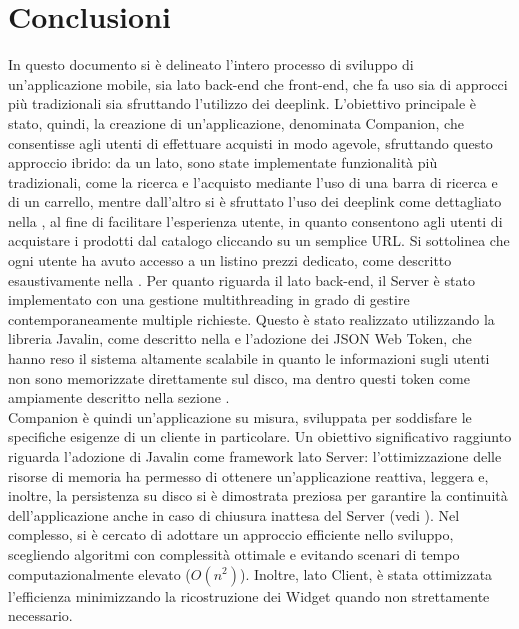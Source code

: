 \chapter{Conclusioni}
In questo documento si è delineato l'intero processo di sviluppo di un'applicazione mobile, sia lato back-end che front-end, che fa uso sia di approcci più tradizionali sia sfruttando l'utilizzo dei deeplink. L'obiettivo principale è stato, quindi, la creazione di un'applicazione, denominata Companion, che consentisse agli utenti di effettuare acquisti in modo agevole, sfruttando questo approccio ibrido: da un lato, sono state implementate funzionalità più tradizionali, come la ricerca e l'acquisto mediante l'uso di una barra di ricerca e di un carrello, mentre dall'altro si è sfruttato l'uso dei deeplink come dettagliato nella , al fine di facilitare l'esperienza utente, in quanto consentono agli utenti di acquistare i prodotti dal catalogo cliccando su un semplice URL. Si sottolinea che ogni utente ha avuto accesso a un listino prezzi dedicato, come descritto esaustivamente nella .
Per quanto riguarda il lato back-end, il Server è stato implementato con una gestione multithreading in grado di gestire contemporaneamente multiple richieste. Questo è stato realizzato utilizzando la libreria Javalin, come descritto nella  e l'adozione dei JSON Web Token, che hanno reso il sistema altamente scalabile in quanto le informazioni sugli utenti non sono memorizzate direttamente sul disco, ma dentro questi token come ampiamente descritto nella sezione .\\
Companion è quindi un'applicazione su misura, sviluppata per soddisfare le specifiche esigenze di un cliente in particolare.
Un obiettivo significativo raggiunto riguarda l'adozione di Javalin come framework lato Server: l'ottimizzazione delle risorse di memoria ha permesso di ottenere un'applicazione reattiva, leggera e, inoltre, la persistenza su disco si è dimostrata preziosa per garantire la continuità dell'applicazione anche in caso di chiusura inattesa del Server (vedi ).
Nel complesso, si è cercato di adottare un approccio efficiente nello sviluppo, scegliendo algoritmi con complessità ottimale e evitando scenari di tempo computazionalmente elevato ($O(n^2)$). Inoltre, lato Client, è stata ottimizzata l'efficienza minimizzando la ricostruzione dei Widget quando non strettamente necessario.

